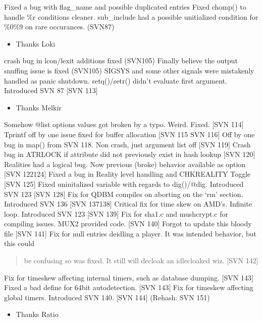 \documentclass[letterpaper,10pt,english]{sphinxmanual}
\begin{document}
\sphinxAtStartPar
Fixed a bug with flag\_name and possible duplicated entries
Fixed chomp() to handle \%r conditions cleaner.
sub\_include had a possible unitialized condition for \%0\sphinxhyphen{}\%9 on rare occurances. (SVN\sphinxhyphen{}87)
\begin{itemize}
\item {} 
\sphinxAtStartPar
Thanks Loki

\end{itemize}

\sphinxAtStartPar
crash bug in lcon/lexit additions \sphinxhyphen{} fixed (SVN\sphinxhyphen{}105)
Finally believe the output snuffing issue is fixed (SVN\sphinxhyphen{}105)
SIGSYS and some other signals were mistakenly handled as panic shutdown.
setq()/setr() didn’t evaluate first argument.  Introduced SVN 87 {[}SVN 113{]}
\begin{itemize}
\item {} 
\sphinxAtStartPar
Thanks Melkir

\end{itemize}

\sphinxAtStartPar
Somehow @list options values got broken by a typo.  Weird.  Fixed. {[}SVN 114{]}
Tprintf off by one issue fixed for buffer allocation {[}SVN 115 \sphinxhyphen{} SVN 116{]}
Off by one bug in map() from SVN 118.  Non crash, just argument list off {[}SVN 119{]}
Crash bug in ATRLOCK if attribute did not previously exist in hash lookup {[}SVN 120{]}
Realities had a logical bug.  Now previous (broke) behavior available as option {[}SVN 122\sphinxhyphen{}124{]}
Fixed a bug in Reality level handling and CHKREALITY Toggle {[}SVN 125{]}
Fixed uninitalized variable with regards to dig()/@dig.  Introduced SVN 123 {[}SVN 128{]}
Fix for QDBM compiles on aborting on the ‘rm’ section.  Introduced SVN 136 {[}SVN 137\sphinxhyphen{}138{]}
Critical fix for time skew on AMD’s.  Infinite loop.  Introduced SVN 123 {[}SVN 139{]}
Fix for sha1.c and mushcrypt.c for compiling issues.  MUX2 provided code.  {[}SVN 140{]}
Forgot to update this bloody file {[}SVN 141{]}
Fix for null entries deidling a player.  It was intended behavior, but this could
\begin{quote}

\sphinxAtStartPar
be confusing so was fixed.  It still will de\sphinxhyphen{}cloak an idle\sphinxhyphen{}cloaked wiz. {[}SVN 142{]}
\end{quote}

\sphinxAtStartPar
Fix for timeskew affecting internal timers, such as database dumping. {[}SVN 143{]}
Fixed a bad define for 64\sphinxhyphen{}bit autodetection. {[}SVN 143{]}
Fix for timeskew affecting global timers. Introduced SVN 140. {[}SVN 144{]} (Rehash: SVN 151)
\begin{itemize}
\item {} 
\sphinxAtStartPar
Thanks Ratio

\end{itemize}
\end{document}
